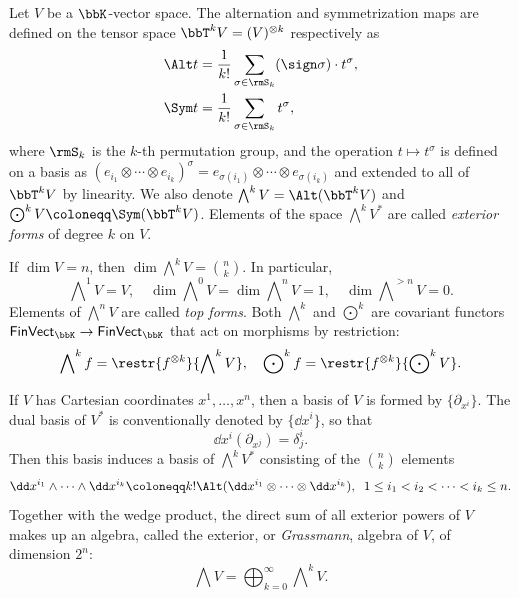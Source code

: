 \begin{defn}
    Let $V$ be a $\bbK$-vector space. The alternation and symmetrization maps are defined on the tensor space $\bbT^k V=(V)^{\otimes k}$ respectively as
    \begin{align}
        \Alt t&=\frac{1}{k!}\sum_{\sigma\in \rmS_k} (\sign\sigma)\cdot t^\sigma,\\
        \Sym t&=\frac{1}{k!}\sum_{\sigma\in \rmS_k} t^\sigma,\label{def sym operator}
    \end{align}
    where $\rmS_k$ is the $k$-th permutation group, and the operation $t\mapsto t^\sigma$ is defined on a basis as $(e_{i_1}\otimes\cdots\otimes e_{i_k})^\sigma=e_{\sigma(i_1)}\otimes\cdots\otimes e_{\sigma(i_k)}$ and extended to all of $\bbT^k V$ by linearity. We also denote $\bigwedge\nolimits^k V=\Alt(\bbT^k V)$ and $\bigodot\nolimits^k V\coloneqq \Sym(\bbT^k V)$. Elements of the space $\bigwedge\nolimits^k V^\ast$ are called \emph{exterior forms} of degree $k$ on $V$. 
    
    If $\dim V=n$, then $\dim \bigwedge\nolimits^k V=\binom{n}{k}$. In particular, 
    \[\bigwedge\nolimits^1 V=V,\quad \dim \bigwedge\nolimits^0 V=\dim \bigwedge\nolimits^n V=1,\quad \dim \bigwedge\nolimits^{>n} V=0.\]
    Elements of $\bigwedge\nolimits^n V$ are called \emph{top forms}.
    Both $\bigwedge\nolimits^k$ and $\bigodot\nolimits^k$ are covariant functors $\mathsf{FinVect}_\bbK\to\mathsf{FinVect}_\bbK$ that act on morphisms by restriction: \[\bigwedge\nolimits^k f=\restr{f^{\otimes k}}{\bigwedge\nolimits^k V},\quad \bigodot\nolimits^k f=\restr{f^{\otimes k}}{\bigodot\nolimits^k V}.\]
\end{defn}

If $V$ has Cartesian coordinates $x^1,\ldots,x^n$, then a basis of $V$ is formed by $\{\partial_{x^i}\}$. The dual basis of $V^\ast$ is conventionally denoted by $\{\dd x^i\}$, so that
\[
    \dd x^i\left(\partial_{x^j}\right)=\delta^i_j.
\]
Then this basis induces a basis of $\bigwedge\nolimits^k V^\ast$ consisting of the $\binom{n}{k}$ elements
\[
\dd x^{i_1}\wedge \cdots \wedge \dd x^{i_k}\coloneqq k!\Alt(\dd x^{i_1}\otimes\cdots\otimes \dd x^{i_k}),\;\;1\leq i_1<i_2<\cdots<i_k\leq n.
\]
Together with the wedge product, the direct sum of all exterior powers of $V$ makes up an algebra, called the exterior, or \emph{Grassmann}, algebra of $V$, of dimension $2^n$:
\[\bigwedge V=\bigoplus_{k=0}^\infty \bigwedge\nolimits^k V.\]



